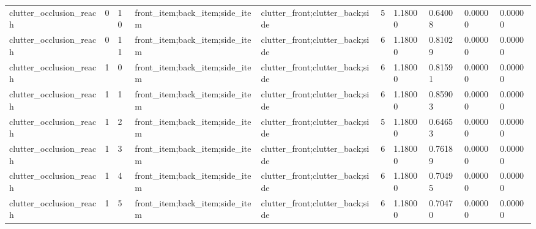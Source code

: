 \documentclass{article}
\begin{document}
\begin{table}[tbp]
{\begin{tabular}{llllllllll}
clutter\_occlusion\_reach & 0 & 10 & front\_item;back\_item;side\_item & clutter\_front;clutter\_back;side & 5 & 1.18000 & 0.64008 & 0.00000 & 0.00000 \\
clutter\_occlusion\_reach & 0 & 11 & front\_item;back\_item;side\_item & clutter\_front;clutter\_back;side & 6 & 1.18000 & 0.81029 & 0.00000 & 0.00000 \\
clutter\_occlusion\_reach & 1 & 0 & front\_item;back\_item;side\_item & clutter\_front;clutter\_back;side & 6 & 1.18000 & 0.81591 & 0.00000 & 0.00000 \\
clutter\_occlusion\_reach & 1 & 1 & front\_item;back\_item;side\_item & clutter\_front;clutter\_back;side & 6 & 1.18000 & 0.85903 & 0.00000 & 0.00000 \\
clutter\_occlusion\_reach & 1 & 2 & front\_item;back\_item;side\_item & clutter\_front;clutter\_back;side & 5 & 1.18000 & 0.64653 & 0.00000 & 0.00000 \\
clutter\_occlusion\_reach & 1 & 3 & front\_item;back\_item;side\_item & clutter\_front;clutter\_back;side & 6 & 1.18000 & 0.76189 & 0.00000 & 0.00000 \\
clutter\_occlusion\_reach & 1 & 4 & front\_item;back\_item;side\_item & clutter\_front;clutter\_back;side & 6 & 1.18000 & 0.70495 & 0.00000 & 0.00000 \\
clutter\_occlusion\_reach & 1 & 5 & front\_item;back\_item;side\_item & clutter\_front;clutter\_back;side & 6 & 1.18000 & 0.70470 & 0.00000 & 0.00000 \\
\bottomrule
\end{tabular}
}
\end{table}

\clearpage
\end{document}

